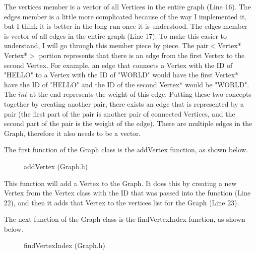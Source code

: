 \documentclass[letterpaper, 10pt]{article}
\begin{document}
\vspace{-0.5em}
\noindent
The vertices member is a vector of all Vertices in the entire graph (Line 16). The edges member is a little more complicated because of the way I implemented it, but I think it is better in the long run once it is understood. The edges member is vector of all edges in the entire graph (Line 17). To make this easier to understand, I will go through this member piece by piece. The pair$<$Vertex* Vertex*$>$ portion represents that there is an edge from the first Vertex to the second Vertex. For example, an edge that connects a Vertex with the ID of "HELLO" to a Vertex with the ID of "WORLD" would have the first Vertex* have the ID of "HELLO" and the ID of the second Vertex* would be "WORLD". The $int$ at the end represents the weight of this edge. Putting these two concepts together by creating another pair, there exists an edge that is represented by a pair (the first part of the pair is another pair of connected Vertices, and the second part of the pair is the weight of the edge). There are multiple edges in the Graph, therefore it also needs to be a vector.

\vspace{0.5em}

\noindent
The first function of the Graph class is the addVertex function, as shown below.

\begin{figure}[H]
  \centering
   
  \caption{addVertex (Graph.h)}
  \label{fig:figure2.6}
\end{figure}

\noindent
This function will add a Vertex to the Graph. It does this by creating a new Vertex from the Vertex class with the ID that was passed into the function (Line 22), and then it adds that Vertex to the vertices list for the Graph (Line 23).

\vspace{1em}
\noindent
The next function of the Graph class is the findVertexIndex function, as shown below.

\begin{figure}[H]
  \centering
   
  \caption{findVertexIndex (Graph.h)}
  \label{fig:figure2.7}
\end{figure}
\end{document}
